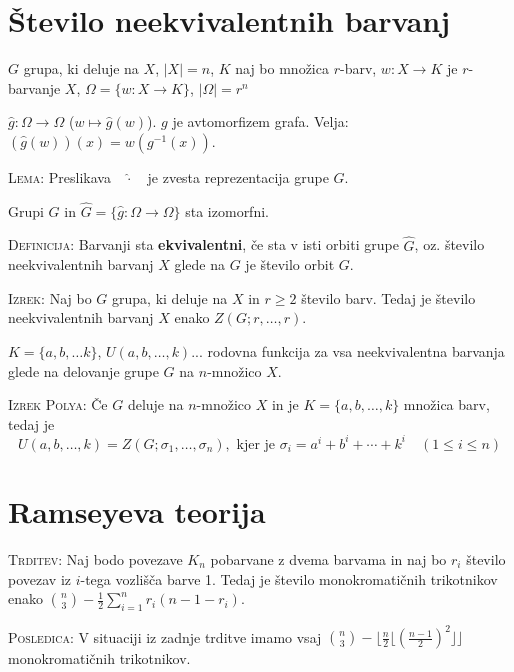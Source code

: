 \documentclass[8pt,a4paper]{amsart}
\theoremstyle{definition} %
\theoremstyle{plain} %
\begin{document}
\vspace{-2ex}
\section{Število neekvivalentnih barvanj}

$G$ grupa, ki deluje na $X$, $|X|=n$, $K$ naj bo množica $r$-barv, $w: X
\longrightarrow K$ je $r$-barvanje $X$, $\Omega = \{ w: X \longrightarrow K \}$,
$|\Omega| = r^n$

$\widehat{g}: \Omega \longrightarrow \Omega$ ($w \mapsto \widehat{g}(w)$). $g$
je avtomorfizem grafa. Velja: $(\widehat{g}(w))(x) = w(g^{-1}(x))$.

\textsc{Lema:} Preslikava~~$\widehat{\cdot}$~~je zvesta reprezentacija grupe
$G$.

Grupi $G$ in $\widehat{G} = \{ \widehat{g}: \Omega \longrightarrow \Omega \}$
sta izomorfni.

\textsc{Definicija:} Barvanji sta \textbf{ekvivalentni}, če sta v isti orbiti
grupe $\widehat{G}$, oz. število neekvivalentnih barvanj $X$ glede na $G$ je
število orbit $G$.

\hfill

\textsc{Izrek:} Naj bo $G$ grupa, ki deluje na $X$ in $r\geq 2$ število barv. Tedaj je
število neekvivalentnih barvanj $X$ enako $Z(G;r,\ldots ,r)$.

\hfill

$K = \{ a,b,\ldots k\}$, $U(a,b,\ldots, k)$... rodovna funkcija za vsa
neekvivalentna barvanja glede na delovanje grupe $G$ na $n$-množico $X$.

\textsc{Izrek Polya:} Če $G$ deluje na $n$-množico $X$ in je $K = \{ a,b,\ldots
,k\}$ množica barv, tedaj je $$ U(a,b,\ldots, k) = Z(G;\sigma_1,\ldots
,\sigma_n),\text{ kjer je } \sigma_i = a^i + b^i + \cdots + k^i \quad (1\leq i
\leq n) $$

\vspace{-2ex}
\section{Ramseyeva teorija}

\textsc{Trditev:} Naj bodo povezave $K_n$ pobarvane z dvema barvama in naj bo
$r_i$ število povezav iz $i$-tega vozlišča barve 1. Tedaj je število
monokromatičnih trikotnikov enako $\binom{n}{3} - \frac{1}{2}\sum_{i=1}^n
r_i(n-1-r_i)$.

\textsc{Posledica:} V situaciji iz zadnje trditve imamo vsaj $\binom{n}{3} -
\lfloor \frac{n}{2} \lfloor (\frac{n-1}{2})^2 \rfloor \rfloor $ monokromatičnih
trikotnikov.
\end{document}
